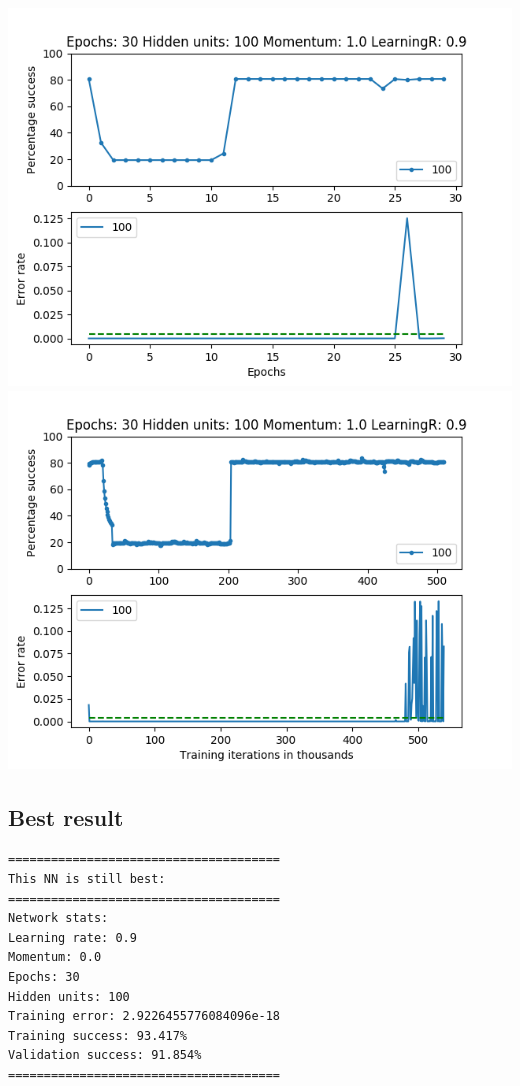 \documentclass[11pt]{article}
\makeatletter
\def\maxwidth{\ifdim\Gin@nat@width>\linewidth\linewidth
    \else\Gin@nat@width\fi}
\let\Oldincludegraphics\includegraphics
\renewcommand{\includegraphics}[1]{\Oldincludegraphics[width=.8\maxwidth]{#1}}
\makeatother
\begin{document}
\includegraphics{Experiment2/E2_NN_Epoch_Momentum_1.0_30Epochs_100Hiddenunits.png}
\includegraphics{Experiment2/E2_NN_Training_Momentum_1.0_30Epochs_100Hiddenunits.png}

\hypertarget{best-result}{%
\subsection{Best result}\label{best-result}}

\begin{verbatim}
======================================
This NN is still best:
======================================
Network stats: 
Learning rate: 0.9
Momentum: 0.0
Epochs: 30
Hidden units: 100
Training error: 2.9226455776084096e-18
Training success: 93.417%
Validation success: 91.854%
======================================
\end{verbatim}
\end{document}
